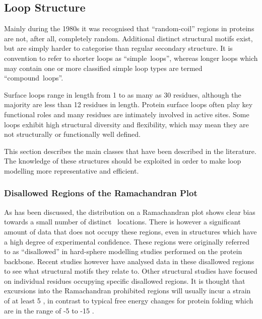 \subsection{Loop Structure}
\label{section:loop_structure}

Mainly during the 1980s it was recognised that ``random-coil'' regions in
proteins are not, after all, completely random. Additional distinct structural motifs exist\cite{NATIVE:anatomy}, but are simply harder to categorise than regular secondary structure. It is convention to refer to shorter loops as ``simple~loops'', whereas longer loops which may contain one or more classified simple loop types are termed ``compound~loops''. 

Surface loops range in length from 1 to as many as 30 residues, although the majority are less than 12 residues in length\cite{METHOD:Fis2000}. Protein surface loops often play key functional roles and many residues are intimately involved in active sites. Some loops exhibit high structural diversity and flexibility, which may mean they are not structurally or functionally well defined\cite{METHOD:Heuser2004}.

This section describes the main classes that have been described in the literature. The knowledge of these structures should be exploited in order to make loop modelling more representative and efficient.





\subsubsection{Disallowed Regions of the Ramachandran Plot}

As has been discussed, the distribution on a Ramachandran plot shows clear bias
towards a small number of distinct \phipsi\ locations. There is however a significant
amount of data that does not occupy these regions, even in structures  which
have a high
degree of experimental confidence.
These regions  were originally referred to as
``disallowed'' in hard-sphere modelling studies performed on the protein
backbone\cite{NATIVE:Ramachandran1968}.  Recent studies however have analysed data
in these disallowed regions to see what structural motifs they relate to\cite{NATIVE:DISALLOWED,NATIVE:Gunasekaran1996}.
Other structural studies have focused on individual residues occupying specific disallowed regions\cite{NATIVE:Vega2000}. It is thought that excursions into the Ramachandran prohibited regions will usually incur a strain of at least 5 \kcalmol, in contrast to typical free energy changes for protein folding which are in the range of -5 to -15 \kcalmol\cite{NATIVE:Her91}.



